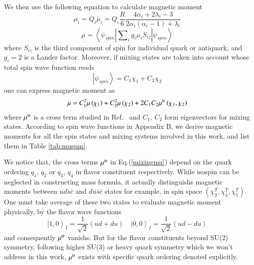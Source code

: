 \documentclass[prd,twocolumn,floatfix,nofootinbib]{revtex4}
\begin{document}
We then use the following equation to calculate magnetic moment \cite{DeGrand:1975cf,Wang:2016dzu}
\begin{equation}\label{mui}
    \mu_{i}=Q_{i}\bar{\mu}_{i}=Q_{i}\frac{R}{6} \frac{4\alpha_{i}+2\lambda_{i}-3}{2\alpha_{i}\left(\alpha_{i}-1\right)+\lambda_{i}}
\end{equation}
\begin{equation}\label{musum}
    \mu=\left\langle \psi_{spin} \left| \sum\nolimits_{i}g_{i}\mu_{i}S_{iz} \right| \psi_{spin} \right\rangle
\end{equation}
where $S_{iz}$ is the third component of spin for individual quark or antiquark, and $g_{i}=2$ is a Lander factor. 
Moreover, if mixing states are taken into account whose total spin wave function reads
\begin{equation}
    \left| \psi_{spin} \right\rangle=C_{1}\chi_{1}+C_{2}\chi_{2}
\end{equation}
one can express magnetic moment as
\begin{equation}\label{mixingmu}
    \mu=C_{1}^{2}\mu\left(\chi_{1}\right)+C_{2}^{2}\mu\left(\chi_{2}\right)+2C_{1}C_{2}\mu^{\rm tr}\left(\chi_{1}, \chi_{2}\right)
\end{equation}
where $\mu^{\rm tr}$ is a cross term studied in Ref.~\cite{Bernotas:2012nz} and $C_{1}$, $C_{2}$ form eigenvectors for mixing states.
According to spin wave functions in Appendix B, we derive magnetic moments for all the spin states and mixing systems involved in this work, and list them in Table \ref{tab:musum}.

We notice that, the cross terms $\mu^{\rm tr}$ in Eq.(\ref{mixingmu}) depend on the quark ordering $q_{1}$, $q_{2}$ or $q_{3}$, $q_{4}$ in flavor constituent respectively.
While isospin can be neglected in constructing mass formula, it actually distinguishs magnetic moments between $ud\bar{s}\bar{c}$ and $du\bar{s}\bar{c}$ states for example, in spin space $(\chi_{2}^{T},\chi_{4}^{T},\chi_{5}^{T})$.
One must take average of these two states to evaluate magnetic moment physically, by the flavor wave functions
\begin{equation}
    {\left| 1,0\right\rangle}_{I}=\frac{1}{\sqrt{2}} \left(ud+du\right) \quad
    {\left| 0,0\right\rangle}_{I}=\frac{1}{\sqrt{2}} \left(ud-du\right)
\end{equation}
and consequently $\mu^{\rm tr}$ vanishs.
But for the flavor constituents beyond SU(2) symmetry, following higher SU(3) or heavy quark symmetry which we won't address in this work, $\mu^{\rm tr}$ exists with specific quark ordering denoted explicitly.
\end{document}
